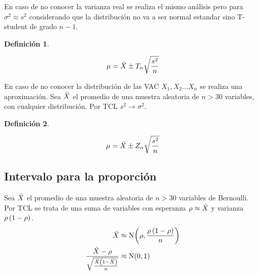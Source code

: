 \documentclass[a5paper,12pt,twoside]{book}
\newtheorem{defn}{{Definición}}[chapter]
\begin{document}
En caso de no conocer la varianza real se realiza el mismo análisis pero para $\sigma^2 \approx s^2$ considerando que la distribución no va a ser normal estandar sino T-student de grado $n-1$.

\begin{mdframed}[style=DefinitionFrame]
    \begin{defn}
    \end{defn}
    \begin{equation*}
        \mu = \ave{X} \pm T_\alpha \sqrt{\frac{s^2}{n}}
    \end{equation*}
\end{mdframed}

En caso de no conocer la distribución de las VAC $X_1, X_2 \dots X_n$ se realiza una aproximación.
Sea $\ave{X}$ el promedio de una muestra aleatoria de $n>30$ variables, con cualquier distribución.
Por TCL $s^2 \to \sigma^2$.

\begin{mdframed}[style=DefinitionFrame]
    \begin{defn}
    \end{defn}
    \begin{equation*}
        \mu = \ave{X} \pm Z_\alpha \sqrt{\frac{s^2}{n}}
    \end{equation*}
\end{mdframed}


\subsection{Intervalo para la proporción}

Sea $\ave{X}$ el promedio de una muestra aleatoria de $n>30$ variables de Bernoulli.
Por TCL se trata de una suma de variables con esperanza $\rho \approx \ave{X}$ y varianza $\rho \inParentheses{1-\rho}$.
\begin{align*}
    \ave{X} & \approx \fx[\nor]{\rho , \frac{\rho \inParentheses{1-\rho}}{n}}
    \\
    \frac{\ave{X}-\rho}{\sqrt{\frac{\ave{X} \inParentheses{1-\ave{X}}}{n}}} & \approx \nor(0,1)
\end{align*}
\end{document}
